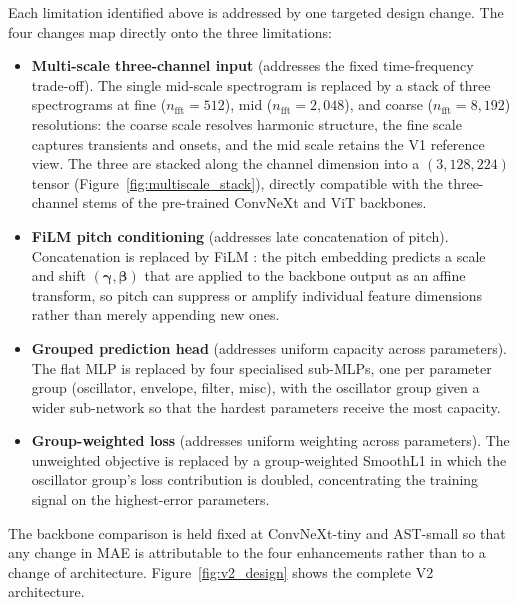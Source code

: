 \noindent
Each limitation identified above is addressed by one targeted design change. The four changes map directly onto the three limitations:
\begin{itemize}
  \item \textbf{Multi-scale three-channel input} (addresses the fixed time-frequency trade-off). The single mid-scale spectrogram is replaced by a stack of three spectrograms at fine ($n_{\text{fft}}=512$), mid ($n_{\text{fft}}=2{,}048$), and coarse ($n_{\text{fft}}=8{,}192$) resolutions: the coarse scale resolves harmonic structure, the fine scale captures transients and onsets, and the mid scale retains the V1 reference view. The three are stacked along the channel dimension into a $(3, 128, 224)$ tensor (Figure~\ref{fig:multiscale_stack}), directly compatible with the three-channel stems of the pre-trained ConvNeXt and ViT backbones.
  \item \textbf{FiLM pitch conditioning} (addresses late concatenation of pitch). Concatenation is replaced by FiLM \cite{perez2018film}: the pitch embedding predicts a scale and shift $(\boldsymbol{\gamma}, \boldsymbol{\beta})$ that are applied to the backbone output as an affine transform, so pitch can suppress or amplify individual feature dimensions rather than merely appending new ones.
  \item \textbf{Grouped prediction head} (addresses uniform capacity across parameters). The flat MLP is replaced by four specialised sub-MLPs, one per parameter group (oscillator, envelope, filter, misc), with the oscillator group given a wider sub-network so that the hardest parameters receive the most capacity.
  \item \textbf{Group-weighted loss} (addresses uniform weighting across parameters). The unweighted objective is replaced by a group-weighted SmoothL1 in which the oscillator group's loss contribution is doubled, concentrating the training signal on the highest-error parameters.
\end{itemize}

\noindent
The backbone comparison is held fixed at ConvNeXt-tiny and AST-small so that any change in MAE is attributable to the four enhancements rather than to a change of architecture. Figure~\ref{fig:v2_design} shows the complete V2 architecture.

